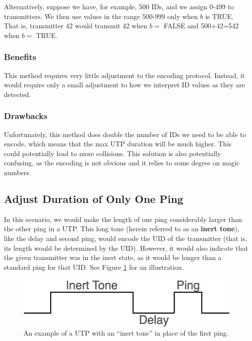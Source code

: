 \documentclass[12pt]{article}
\begin{document}
Alternatively, suppose we have, for example, 500 IDs, and we assign 0-499 to
transmitters.
We then use values in the range 500-999 only when $b$ is TRUE.
That is, transmitter 42 would transmit 42 when $b=$ FALSE and 500+42=542 when
$b=$ TRUE.

\subsubsection{Benefits}

This method requires very little adjustment to the encoding protocol.
Instead, it would require only a small adjustment to how we interpret ID values
as they are detected.

\subsubsection{Drawbacks}

Unfortunately, this method does double the number of IDs we need to be able to
encode, which means that the max UTP duration will be much higher.
This could potentially lead to more collisions.
This solution is also potentially confusing, as the encoding is not obvious
and it relies to some degree on magic numbers.

\subsection{Adjust Duration of Only One Ping}

In this scenario, we would make the length of one ping considerably larger
than the other ping in a UTP.
This long tone (herein referred to as an {\bf inert tone}),
like the delay and second ping, would encode the UID of the
transmitter (that is, its length would be determined by the UID).
However, it would also indicate that the given transmitter was in the inert
state, as it would be longer than a standard ping for that UID.
See Figure \ref{fig-inert} for an illustration.

\begin{figure}[h]
\centering
\includegraphics[scale=0.5]{inert_tone}

\caption{An example of a UTP with an ``inert tone'' in place of the first
ping.} \label{fig-inert}
\end{figure}
\end{document}
